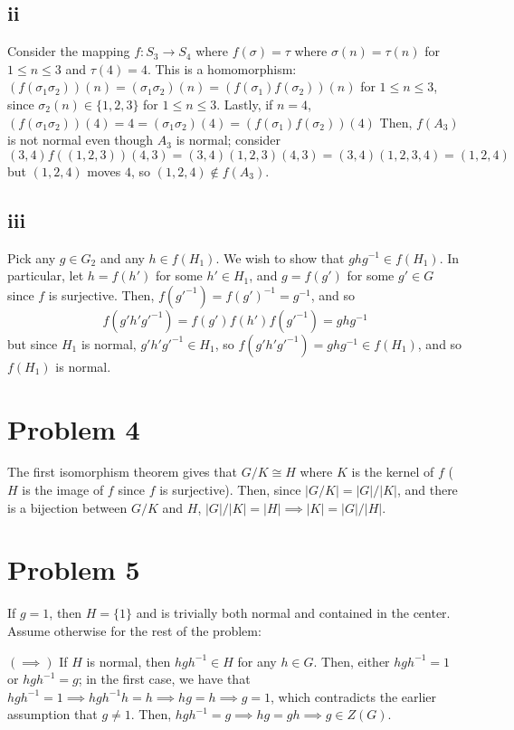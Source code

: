 \documentclass[12pt,letterpaper]{article}
\theoremstyle{definition}
\begin{document}
\subsection*{ii}

Consider the mapping $f: S_{3} \rightarrow S_{4}$ where $f(\sigma) = \tau$ where $\sigma(n) = \tau(n)$ for $1 \leq n \leq 3$ and $\tau(4) = 4$. This is a homomorphism: $(f(\sigma_{1}\sigma_{2}))(n) = (\sigma_{1}\sigma_{2})(n) = (f(\sigma_{1})f(\sigma_{2}))(n)$ for $1 \leq n \leq 3$, since $\sigma_{2}(n) \in \{1,2,3\}$ for $1 \leq n \leq 3$. Lastly, if $n = 4$, $(f(\sigma_{1}\sigma_{2}))(4) = 4 = (\sigma_{1}\sigma_{2})(4) = (f(\sigma_{1})f(\sigma_{2}))(4)$ Then, $f(A_{3})$ is not normal even though $A_{3}$ is normal; consider
\[
  (3,4)f((1,2,3))(4,3) = (3,4)(1,2,3)(4,3) = (3,4)(1,2,3,4) = (1, 2, 4)
\]
but $(1,2,4)$ moves $4$, so $(1,2,4) \notin f(A_{3})$.

\subsection*{iii}

Pick any $g \in G_{2}$ and any $h \in f(H_{1})$. We wish to show that $ghg^{-1} \in f(H_{1})$. In particular, let $h = f(h')$ for some $h' \in H_{1}$, and $g = f(g')$ for some $g' \in G$ since $f$ is surjective. Then, $f(g'^{-1}) = f(g')^{-1} = g^{-1}$, and so
\[
  f(g'h'g'^{-1}) = f(g')f(h')f(g'^{-1}) = ghg^{-1}
\]
but since $H_{1}$ is normal, $g'h'g'^{-1} \in H_{1}$, so $f(g'h'g'^{-1}) = ghg^{-1} \in f(H_{1})$, and so $f(H_{1})$ is normal.

\section*{Problem 4}

The first isomorphism theorem gives that $G/K \cong H$ where $K$ is the kernel of $f$ ($H$ is the image of $f$ since $f$ is surjective). Then, since $|G/K| = |G|/|K|$, and there is a bijection between $G/K$ and $H$, $|G|/|K| = |H| \implies |K| = |G|/|H|$.

\section*{Problem 5}

If $g = 1$, then $H = \{1\}$ and is trivially both normal and contained in the center. Assume otherwise for the rest of the problem:

$(\implies)$ If $H$ is normal, then $hgh^{-1} \in H$ for any $h \in G$. Then, either $hgh^{-1} = 1$ or $hgh^{-1} = g$; in the first case, we have that $hgh^{-1} = 1 \implies hgh^{-1}h = h \implies hg = h \implies g = 1$, which contradicts the earlier assumption that $g \neq 1$. Then, $hgh^{-1} = g \implies hg = gh \implies g \in Z(G)$.
\end{document}
